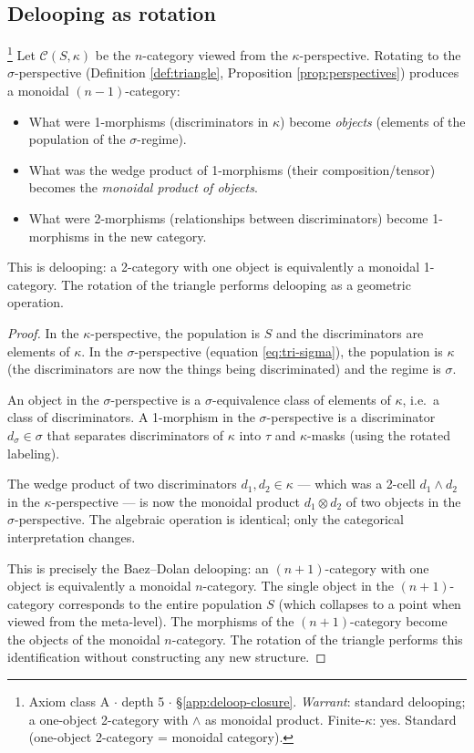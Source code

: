 \subsection{Delooping as rotation}\label{sec:delooping}

\begin{theorem}\label{thm:deloop}\footnote{Axiom class \textsf{A} $\cdot$ depth 5 $\cdot$ \S\ref{app:deloop-closure}.  \emph{Warrant}: standard delooping; a one-object 2-category with $\wedge$ as monoidal product. Finite-$\kappa$: yes. Standard (one-object 2-category = monoidal category).}
Let $\mathcal{C}(S,\kappa)$ be the $n$-category
viewed from the $\kappa$-perspective. Rotating to the
$\sigma$-perspective (Definition \ref{def:triangle},
Proposition \ref{prop:perspectives}) produces a monoidal
$(n-1)$-category:
\begin{itemize}[nosep]
  \item What were 1-morphisms (discriminators in $\kappa$)
    become \emph{objects} (elements of the population of
    the $\sigma$-regime).
  \item What was the wedge product of 1-morphisms (their
    composition/tensor) becomes the \emph{monoidal product
    of objects}.
  \item What were 2-morphisms (relationships between
    discriminators) become 1-morphisms in the new category.
\end{itemize}
This is delooping: a 2-category with one object is
equivalently a monoidal 1-category. The rotation of
the triangle performs delooping as a geometric operation.
\end{theorem}

\begin{proof}
In the $\kappa$-perspective, the population is $S$ and the
discriminators are elements of $\kappa$. In the
$\sigma$-perspective (equation \ref{eq:tri-sigma}), the
population is $\kappa$ (the discriminators are now the
things being discriminated) and the regime is $\sigma$.

An object in the $\sigma$-perspective is a
$\sigma$-equivalence class of elements of $\kappa$, i.e.\
a class of discriminators. A 1-morphism in the
$\sigma$-perspective is a discriminator $d_\sigma \in \sigma$
that separates discriminators of $\kappa$ into $\tau$ and
$\kappa$-masks (using the rotated labeling).

The wedge product of two discriminators
$d_1, d_2 \in \kappa$ --- which was a 2-cell
$d_1 \wedge d_2$ in the $\kappa$-perspective --- is now
the monoidal product $d_1 \otimes d_2$ of two objects in
the $\sigma$-perspective. The algebraic operation is
identical; only the categorical interpretation changes.

This is precisely the Baez--Dolan delooping: an
$(n+1)$-category with one object is equivalently a
monoidal $n$-category. The single object in the
$(n+1)$-category corresponds to the entire population
$S$ (which collapses to a point when viewed from the
meta-level). The morphisms of the $(n+1)$-category become
the objects of the monoidal $n$-category. The rotation
of the triangle performs this identification without
constructing any new structure.
\end{proof}


